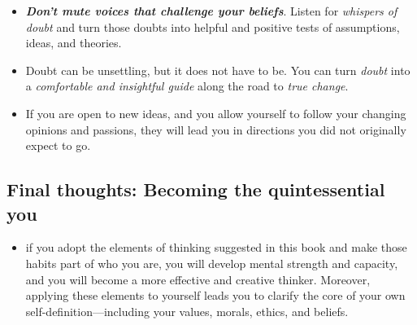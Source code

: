 \documentclass[11pt]{article}
\begin{document}
\begin{itemize}
\begin{itemize}
\item \emph{\textbf{Don’t mute voices that challenge your beliefs}}. Listen for \emph{whispers of doubt} and turn those doubts into helpful and positive tests of assumptions, ideas, and theories. 

\item Doubt can be unsettling, but it does not have to be. You can turn \emph{doubt} into a \emph{comfortable and insightful guide} along the road to \emph{true change}.

\item If you are open to new ideas, and you allow yourself to follow your changing opinions and passions, they will lead you in directions you did not originally expect to go. 
\end{itemize}


\end{itemize}


\subsection{Final thoughts: Becoming the quintessential you}
\begin{itemize}
\item if you adopt the elements of thinking suggested in this book and make those habits part of who you are, you will develop mental strength and capacity, and you will become a more effective and creative thinker. Moreover, applying these elements to yourself leads you to clarify the core of your own self-definition—including your values, morals, ethics, and beliefs. 
\end{itemize}

\newpage


\end{document}
